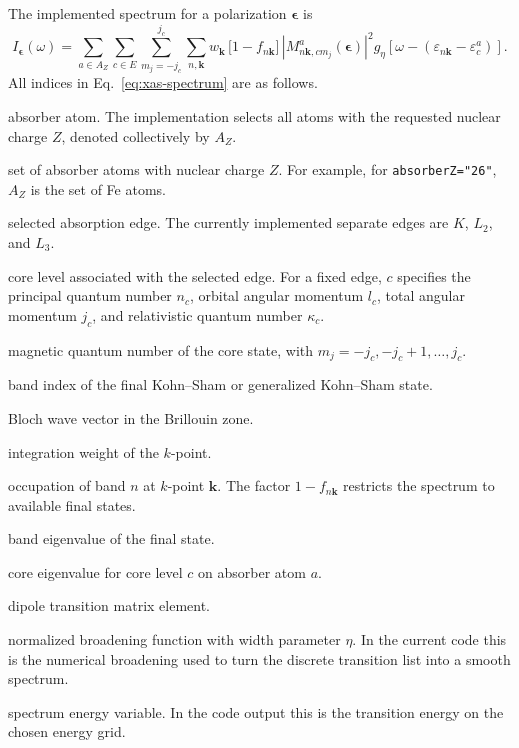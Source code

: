 \documentclass[11pt,a4paper]{article}
\newcommand{\kvec}{\mathbf{k}}
\newcommand{\epsvec}{\boldsymbol{\epsilon}}
\newcommand{\absr}{a}
\begin{document}
The implemented spectrum for a polarization \(\epsvec\) is
\begin{equation}
\label{eq:xas-spectrum}
  I_{\epsvec}(\omega)
  =
  \sum_{\absr\in A_Z}
  \sum_{c\in E}
  \sum_{m_j=-j_c}^{j_c}
  \sum_{n,\kvec}
  w_{\kvec}\,
  \bigl[1-f_{n\kvec}\bigr]\,
  \left|
     M^{\absr}_{n\kvec,c m_j}(\epsvec)
  \right|^2
  g_{\eta}\!\left[
     \omega -
     \left(\varepsilon_{n\kvec}-\varepsilon^{\absr}_{c}\right)
  \right].
\end{equation}
All indices in Eq.~\eqref{eq:xas-spectrum} are as follows.
\begin{description}[leftmargin=2.7cm,style=nextline]
  \item[\(\absr\)] absorber atom. The implementation selects all atoms with
  the requested nuclear charge \(Z\), denoted collectively by \(A_Z\).
  \item[\(A_Z\)] set of absorber atoms with nuclear charge \(Z\). For example,
  for \texttt{absorberZ="26"}, \(A_Z\) is the set of Fe atoms.
  \item[\(E\)] selected absorption edge. The currently implemented separate
  edges are \(K\), \(L_2\), and \(L_3\).
  \item[\(c\)] core level associated with the selected edge. For a fixed edge,
  \(c\) specifies the principal quantum number \(n_c\), orbital angular momentum
  \(l_c\), total angular momentum \(j_c\), and relativistic quantum number
  \(\kappa_c\).
  \item[\(m_j\)] magnetic quantum number of the core state, with
  \(m_j=-j_c,-j_c+1,\ldots,j_c\).
  \item[\(n\)] band index of the final Kohn--Sham or generalized Kohn--Sham
  state.
  \item[\(\kvec\)] Bloch wave vector in the Brillouin zone.
  \item[\(w_{\kvec}\)] integration weight of the \(k\)-point.
  \item[\(f_{n\kvec}\)] occupation of band \(n\) at \(k\)-point \(\kvec\).
  The factor \(1-f_{n\kvec}\) restricts the spectrum to available final states.
  \item[\(\varepsilon_{n\kvec}\)] band eigenvalue of the final state.
  \item[\(\varepsilon^{\absr}_{c}\)] core eigenvalue for core level \(c\) on
  absorber atom \(\absr\).
  \item[\(M^{\absr}_{n\kvec,c m_j}(\epsvec)\)] dipole transition matrix element.
  \item[\(g_{\eta}\)] normalized broadening function with width parameter
  \(\eta\). In the current code this is the numerical broadening used to turn
  the discrete transition list into a smooth spectrum.
  \item[\(\omega\)] spectrum energy variable. In the code output this is the
  transition energy on the chosen energy grid.
\end{description}
\end{document}
